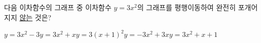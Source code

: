 다음 이차함수의 그래프 중 이차함수 $y=3x^2$의 그래프를 평행이동하여 완전히 포개어지지 \underline{않는} 것은?
\begin{choicesii}{$y=3x^2-3$}{$y=3x^2+x$}{$y=3(x+1)^2$}{$y=-3x^2+3x$}{$y=3x^2+x+1$}\end{choicesii}
